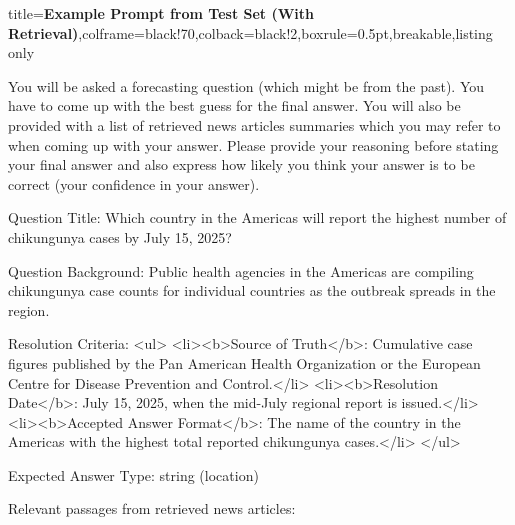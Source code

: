 \begin{tcblisting}{title={\textbf{Example Prompt from Test Set (With Retrieval)}},colframe=black!70,colback=black!2,boxrule=0.5pt,breakable,listing only}

You will be asked a forecasting question (which might be from the past).
You have to come up with the best guess for the final answer.
You will also be provided with a list of retrieved news articles summaries which you may refer to when coming up with your answer.
Please provide your reasoning before stating your final answer and also express how likely you think your answer is to be correct (your confidence in your answer).

Question Title:
Which country in the Americas will report the highest number of chikungunya cases by July 15, 2025?

Question Background:
Public health agencies in the Americas are compiling chikungunya case counts for individual countries as the outbreak spreads in the region.

Resolution Criteria:
<ul>
  <li><b>Source of Truth</b>: Cumulative case figures published by the Pan American Health Organization or the European Centre for Disease Prevention and Control.</li>
  <li><b>Resolution Date</b>: July 15, 2025, when the mid-July regional report is issued.</li>
  <li><b>Accepted Answer Format</b>: The name of the country in the Americas with the highest total reported chikungunya cases.</li>
</ul>

Expected Answer Type:
string (location)

Relevant passages from retrieved news articles:


\end{tcblisting}
